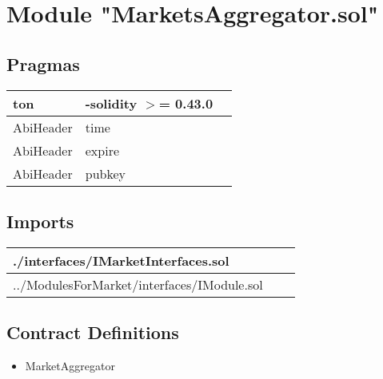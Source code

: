
\section{Module "MarketsAggregator.sol"}


\subsection{Pragmas}


\noindent\begin{tabular}{|l|l|p{5cm}|}\hline
ton & -solidity $>$= 0.43.0 &\\\hline
AbiHeader &  time &\\\hline
AbiHeader &  expire &\\\hline
AbiHeader &  pubkey &\\\hline
\end{tabular}


\subsection{Imports}


\noindent\begin{tabular}{|l|l|p{5cm}|}\hline
./interfaces/IMarketInterfaces.sol &\\\hline
../ModulesForMarket/interfaces/IModule.sol &\\\hline
\end{tabular}


\subsection{Contract Definitions}

\begin{itemize}
\item MarketAggregator
\end{itemize}
